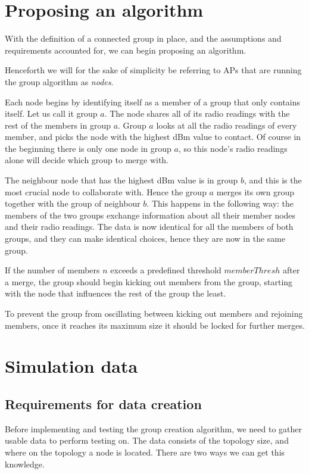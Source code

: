     \section{Proposing an algorithm}\label{algorithm}
    With the definition of a connected group in place, and the assumptions and requirements accounted for, we can begin proposing an algorithm.

    Henceforth we will for the sake of simplicity be referring to APs that are running the group algorithm as \textit{nodes}.

    Each node begins by identifying itself as a member of a group that only contains itself. Let us call it group $a$. The node shares all of
    its radio readings with the rest of the members in group $a$. Group $a$ looks at all the radio readings of every member, and picks the node with the highest dBm value
    to contact. Of course in the beginning there is only one node in group $a$, so this node's radio readings alone will decide which group to merge with. 

    The neighbour node that has the highest dBm value is in group $b$, and this is the most crucial node to collaborate with. Hence the group $a$ merges its own group together
    with the group of neighbour $b$. This happens in the following way: the members of the two groups exchange information about all their member nodes and their radio readings.
    The data is now identical for all the members of both groups, and they can make identical choices, hence they are now in the same group. 

    If the number of members $n$ exceeds a predefined threshold $memberThresh$ after a merge, the group should begin kicking out members from the group, starting with the node
    that influences the rest of the group the least. 

    To prevent the group from oscillating between kicking out members and rejoining members, once it reaches
    its maximum size it should be locked for further merges. 

    \section{Simulation data} \label{simdata}

    \subsection{Requirements for data creation}
    Before implementing and testing the group creation algorithm, we need to gather usable data to perform testing on.
    The data consists of the topology size, and where on the topology a node is located. There are two ways we can get this knowledge.

